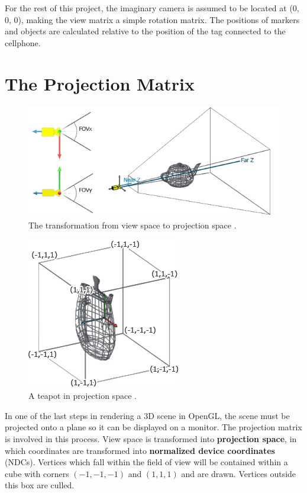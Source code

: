 For the rest of this project, the imaginary camera is assumed to be located at (0, 0, 0), making the view matrix a simple rotation matrix. The positions of markers and objects are calculated relative to the position of the tag connected to the cellphone.

\section{The Projection Matrix}

\begin{figure}
	\centering
	\includegraphics[width=\linewidth]{Figures/ProjectionMatrix.png}
	\decoRule
	\caption{The transformation from view space to projection space \cite{CodingLabs}.}
	\label{fig:ProjectionMatrix}
\end{figure}

\begin{figure}
	\centering
	\includegraphics{Figures/ProjectionMatrix2.png}
	\decoRule
	\caption{A teapot in projection space \cite{CodingLabs}.}
	\label{fig:ProjectionMatrix2}
\end{figure}

In one of the last steps in rendering a 3D scene in OpenGL, the scene must be projected onto a plane so it can be displayed on a monitor. The projection matrix is involved in this process. View space is transformed into \textbf{projection space}, in which coordinates are transformed into \textbf{normalized device coordinates} (NDCs). Vertices which fall within the field of view will be contained within a cube with corners $(-1, -1, -1)$ and $(1, 1, 1)$ and are drawn. Vertices outside this box are culled. 

